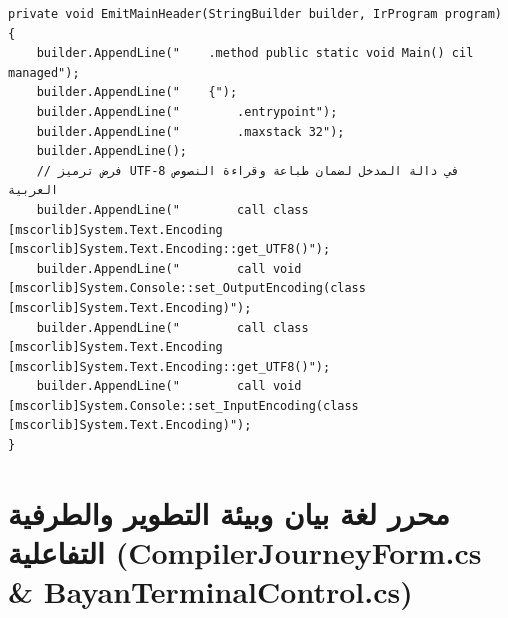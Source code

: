 \documentclass[12pt,a4paper]{report}
\begin{document}
\begin{lstlisting}[language={[Sharp]C}, caption={مقتطف حقيقي من ضبط ترميز UTF-8 وتوليد الملف التنفيذي عبر ilasm}]
private void EmitMainHeader(StringBuilder builder, IrProgram program)
{
    builder.AppendLine("    .method public static void Main() cil managed");
    builder.AppendLine("    {");
    builder.AppendLine("        .entrypoint");
    builder.AppendLine("        .maxstack 32");
    builder.AppendLine();
    // فرض ترميز UTF-8 في دالة المدخل لضمان طباعة وقراءة النصوص العربية
    builder.AppendLine("        call class [mscorlib]System.Text.Encoding [mscorlib]System.Text.Encoding::get_UTF8()");
    builder.AppendLine("        call void [mscorlib]System.Console::set_OutputEncoding(class [mscorlib]System.Text.Encoding)");
    builder.AppendLine("        call class [mscorlib]System.Text.Encoding [mscorlib]System.Text.Encoding::get_UTF8()");
    builder.AppendLine("        call void [mscorlib]System.Console::set_InputEncoding(class [mscorlib]System.Text.Encoding)");
}
\end{lstlisting}

\newpage

\section{محرر لغة بيان وبيئة التطوير والطرفية التفاعلية (CompilerJourneyForm.cs \& BayanTerminalControl.cs)}
\end{document}

